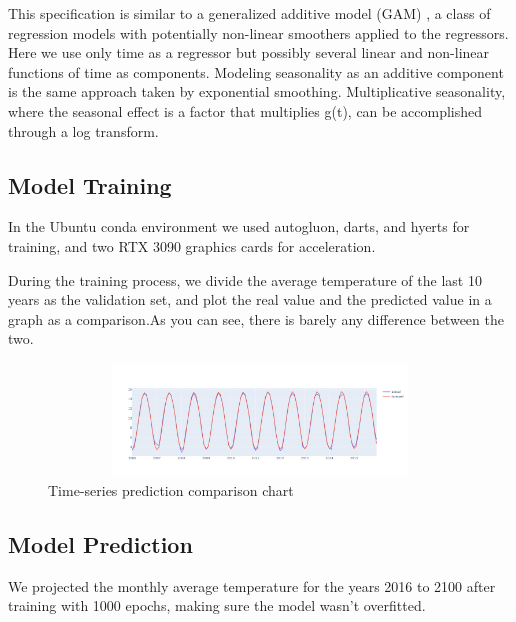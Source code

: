 \documentclass{apmcmthesis}
\begin{document}
This specification is similar to a generalized additive model (GAM) , a class of regression models with potentially non-linear smoothers applied to the
regressors. Here we use only time as a regressor but possibly several linear and non-linear
functions of time as components. Modeling seasonality as an additive component is the
same approach taken by exponential smoothing. Multiplicative seasonality,
where the seasonal effect is a factor that multiplies g(t), can be accomplished through a
log transform.

\subsection{Model Training}
In the Ubuntu conda environment we used autogluon, darts, and hyerts for training, and two RTX 3090 graphics cards for acceleration.

During the training process, we divide the average temperature of the last 10 years as the validation set, and plot the real value and the predicted value in a graph as a comparison.As you can see, there is barely any difference between the two.

\begin{figure}[!h]
    \centering
    \includegraphics[width=13cm,height=3cm]{APMCMThesis/figures/0.png}
    \caption{Time-series prediction comparison chart}
    \label{fig:my_label}
\end{figure}

\subsection{Model Prediction}
We projected the monthly average temperature for the years 2016 to 2100 after training with 1000 epochs, making sure the model wasn't overfitted.
\end{document}
